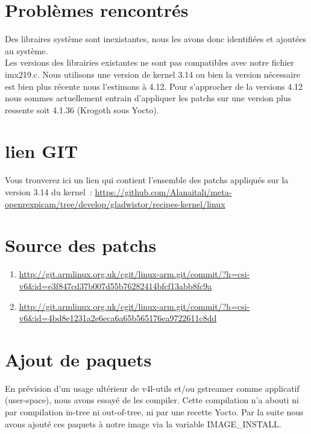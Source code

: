 \section{Problèmes rencontrés}
Des libraires système sont inexistantes, nous les avons donc identifiées et ajoutées au système. \\

Les versions des librairies existantes ne sont pas compatibles avec notre fichier imx219.c.
Nous utilisons une version de kernel 3.14 ou bien la version nécessaire est bien plus récente nous
l’estimons à 4.12. Pour s’approcher de la versions 4.12 nous sommes actuellement entrain d’appliquer
les patchs sur une version plus ressente soit 4.1.36 (Krogoth sous Yocto).

\section{lien GIT}
Vous trouverez ici un lien qui contient l’ensemble des patchs appliqués sur la version 3.14 du kernel :
\href{https://github.com/Alanaitali/meta-openrexpicam/tree/develop/gladwistor/recipes-kernel/linux}
{https://github.com/Alanaitali/meta-openrexpicam/tree/develop/gladwistor/recipes-kernel/linux}

\section{Source des patchs}

\begin{enumerate}

\item \href{http://git.armlinux.org.uk/cgit/linux-arm.git/commit/?h=csi-v6&id=e3f847cd37b007d55b76282414bfcf13abb8fc9a}
{http://git.armlinux.org.uk/cgit/linux-arm.git/commit/?h=csi-v6\&id=e3f847cd37b007d55b76282414bfcf13abb8fc9a}

\item \href{http://git.armlinux.org.uk/cgit/linux-arm.git/commit/?h=csi-v6&id=4bd8e1231a2e6eca6a65b565176ea9722611c8dd}
{http://git.armlinux.org.uk/cgit/linux-arm.git/commit/?h=csi-v6\&id=4bd8e1231a2e6eca6a65b565176ea9722611c8dd}

\end{enumerate}

\section{Ajout de paquets}

En prévision d’un usage ultérieur de v4l-utils et/ou gstreamer comme applicatif
(user-space), nous avons essayé de les compiler. Cette compilation n’a abouti ni
par compilation in-tree ni out-of-tree, ni par une recette Yocto.
Par la suite nous avons ajouté ces paquets à notre image via la
variable IMAGE\_INSTALL.

